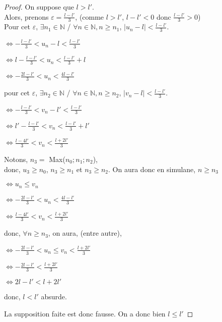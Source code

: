 \documentclass[a4paper,10pt]{book}
\begin{document}
  \begin{proof}
    On suppose que $l > l'$.\\
    Alors, prenons $\varepsilon = \frac{l - l'}{3}$, (comme $l > l'$, $l-l'<0$ donc $\frac{l - l'}{3} > 0$)\\
    Pour cet $\varepsilon$, $\exists n_1 \in \mathbb{N}$ / $\forall n \in \mathbb{N}, n \geq n_1$, $|u_n - l| < \frac{l - l'}{3}$.
    \begin{description}
      \item $\Leftrightarrow -\frac{l - l'}{3} < u_n - l < \frac{l - l'}{3}$
      \item $\Leftrightarrow l-\frac{l - l'}{3} < u_n < \frac{l - l'}{3} + l$
      \item $\Leftrightarrow -\frac{2l - l'}{3} < u_n < \frac{4l - l'}{3}$
    \end{description}

    pour cet $\varepsilon$,  $\exists n_2 \in \mathbb{N}$ / $\forall n \in \mathbb{N}, n \geq n_2$, $|v_n - l| < \frac{l - l'}{3}$.
    \begin{description}
      \item $\Leftrightarrow -\frac{l - l'}{3} < v_n - l' < \frac{l - l'}{3}$
      \item $\Leftrightarrow l'-\frac{l - l'}{3} < v_n < \frac{l - l'}{3}+l'$
      \item $\Leftrightarrow \frac{l - 4l'}{3} < v_n < \frac{l + 2l'}{3}$
    \end{description}

    Notons, $n_3 =$ Max($n_0; n_1; n_2$),\\
    donc, $u_3 \geq n_0$, $n_3 \geq n_1$ et $n_3 \geq n_2$. On aura donc en simulane, $n \geq n_3$
    \begin{description}
      \item $\Leftrightarrow u_n \leq v_n$
      \item $\Leftrightarrow -\frac{2l - l'}{3} < u_n < \frac{4l - l'}{3}$
      \item $\Leftrightarrow \frac{l - 4l'}{3} < v_n < \frac{l + 2l'}{3}$
    \end{description}

    donc, $\forall n \geq n_3$, on aura, (entre autre),
    \begin{description}
       \item $\Leftrightarrow -\frac{2l - l'}{3} < u_n \leq v_n< \frac{l + 2l'}{3}$
       \item $\Leftrightarrow -\frac{2l - l'}{3} < \frac{l + 2l'}{3}$
       \item $\Leftrightarrow 2l - l' < l + 2l'$
       \item donc, $l < l'$ absurde.
    \end{description}
    La supposition faite est donc fausse. On a donc bien $l \leq l'$
  \end{proof}






	
\end{document}
